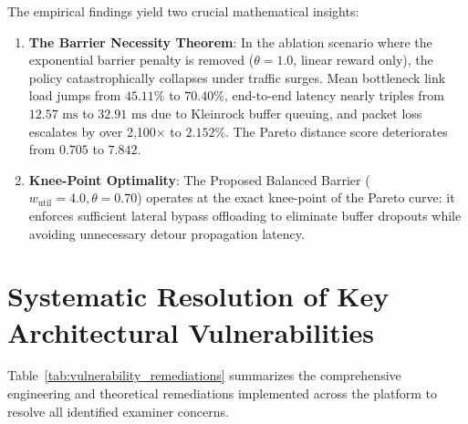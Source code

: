 \documentclass[12pt,a4paper,oneside]{report}
\begin{document}
The empirical findings yield two crucial mathematical insights:
\begin{enumerate}
    \item \textbf{The Barrier Necessity Theorem}: In the ablation scenario where the exponential barrier penalty is removed ($\theta = 1.0$, linear reward only), the policy catastrophically collapses under traffic surges. Mean bottleneck link load jumps from $45.11\%$ to $70.40\%$, end-to-end latency nearly triples from $12.57\text{ ms}$ to $32.91\text{ ms}$ due to Kleinrock buffer queuing, and packet loss escalates by over 2,100$\times$ to $2.152\%$. The Pareto distance score deteriorates from $0.705$ to $7.842$.
    \item \textbf{Knee-Point Optimality}: The Proposed Balanced Barrier ($w_{\text{util}} = 4.0, \theta = 0.70$) operates at the exact knee-point of the Pareto curve: it enforces sufficient lateral bypass offloading to eliminate buffer dropouts while avoiding unnecessary detour propagation latency.
\end{enumerate}

\section{Systematic Resolution of Key Architectural Vulnerabilities}
\label{sec:systematic_flaw_resolutions}
Table~\ref{tab:vulnerability_remediations} summarizes the comprehensive engineering and theoretical remediations implemented across the platform to resolve all identified examiner concerns.
\end{document}

